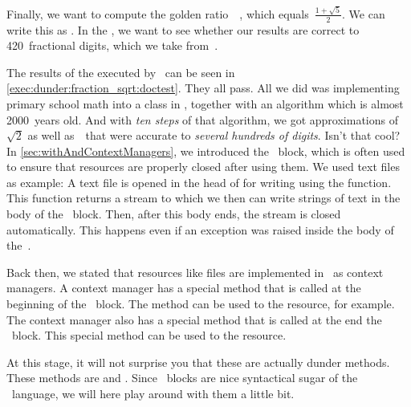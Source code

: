 Finally, we want to compute the golden ratio~\numberGoldenRatio~\cite{EOEBEB:GR,EHF2008EEOGTGOJLH11FEEEELIEILHIATBG11EAPWMETBFR,S2024DEOGRPOT}, which equals~$\frac{1+\sqrt{5}}{2}$.
We can write this as .
In the , we want to see whether our results are correct to 420~fractional digits, which we take from~\cite{F1996TGR1T2P}.

The results of the  executed by \pytest\ can be seen in \cref{exec:dunder:fraction_sqrt:doctest}.
They all pass.
All we did was implementing primary school math into a class in \python, together with an algorithm which is almost 2000~years old.
And with \emph{ten steps} of that algorithm, we got approximations of~$\sqrt{2}$ as well as~\numberGoldenRatio\ that were accurate to \emph{several hundreds of digits}.
Isn't that cool?%
%
\FloatBarrier%
\endhsection%
%
%
\label{sec:dunder:contextManager}%
%
In \cref{sec:withAndContextManagers}, we introduced the ~block, which is often used to ensure that resources are properly closed after using them.
We used text files as example:
A text file is opened in the head of  for writing using the  function.
This function returns a stream to which we then can write strings of text in the body of the ~block.
Then, after this body ends, the stream is closed automatically.
This happens even if an exception was raised inside the body of the~.

Back then, we stated that resources like files are implemented in \python\ as context managers.
A context manager has a special method that is called at the beginning of the ~block.
The method can be used to  the resource, for example.
The context manager also has a special method that is called at the end the ~block.
This special method can be used to  the resource.

At this stage, it will not surprise you that these  are actually dunder methods.
These methods are  and .
Since ~blocks are nice syntactical sugar of the \python\ language, we will here play around with them a little bit.


